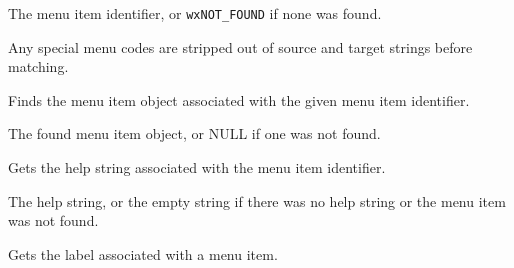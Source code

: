 


The menu item identifier, or {\tt wxNOT\_FOUND} if none was found.


Any special menu codes are stripped out of source and target strings
before matching.

\label{wxmenubarfinditem}


Finds the menu item object associated with the given menu item identifier.





The found menu item object, or NULL if one was not found.

\label{wxmenubargethelpstring}


Gets the help string associated with the menu item identifier.




The help string, or the empty string if there was no help string or the menu item
was not found.



\label{wxmenubargetlabel}


Gets the label associated with a menu item.




